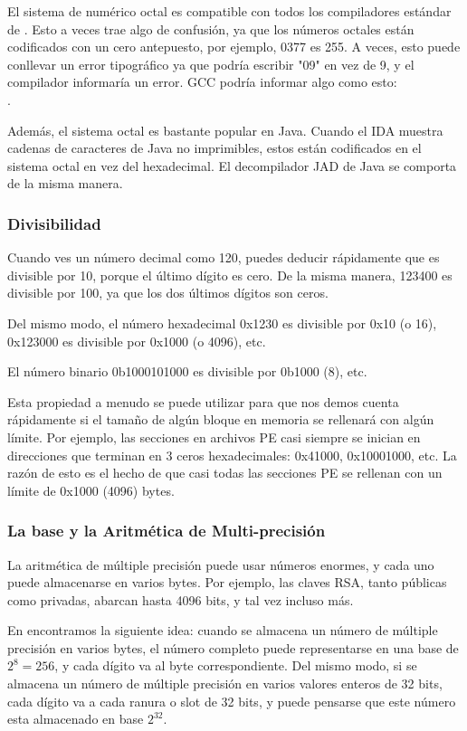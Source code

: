El sistema de numérico octal es compatible con todos los compiladores estándar de \CCpp.
Esto a veces trae algo de confusión, ya que los números octales están codificados con un cero antepuesto, por ejemplo, 0377 es 255.
A veces, esto puede conllevar un error tipográfico ya que podría escribir "09" en vez de 9, y el compilador informaría un error.
GCC podría informar algo como esto: \\
.

Además, el sistema octal es bastante popular en Java. Cuando el IDA muestra cadenas de caracteres de Java no imprimibles,
estos están codificados en el sistema octal en vez del hexadecimal.
El decompilador JAD de Java se comporta de la misma manera.

\subsubsection{Divisibilidad}

Cuando ves un número decimal como 120, puedes deducir rápidamente que es divisible por 10, porque el último dígito es cero.
De la misma manera, 123400 es divisible por 100, ya que los dos últimos dígitos son ceros.

Del mismo modo, el número hexadecimal 0x1230 es divisible por 0x10 (o 16), 0x123000 es divisible por 0x1000 (o 4096), etc.

El número binario 0b1000101000 es divisible por 0b1000 (8), etc.

Esta propiedad a menudo se puede utilizar para que nos demos cuenta rápidamente si el tamaño de algún bloque en memoria se rellenará con algún límite.
Por ejemplo, las secciones en archivos \ac {PE} casi siempre se inician en direcciones que terminan en 3 ceros hexadecimales: 0x41000, 0x10001000, etc.
La razón de esto es el hecho de que casi todas las secciones \ac{PE} se rellenan con un límite de 0x1000 (4096) bytes.

\subsubsection{La base y la Aritmética de  Multi-precisión }

La aritmética de  múltiple precisión puede usar números enormes, y cada uno puede almacenarse en varios bytes.
Por ejemplo, las claves RSA, tanto públicas como privadas, abarcan hasta 4096 bits, y tal vez incluso más.

En  encontramos la siguiente idea: cuando se almacena un número de  múltiple precisión en varios bytes,
el número completo puede representarse en una base de $ 2 ^ 8 = 256 $, y cada dígito va al byte correspondiente.
Del mismo modo, si se almacena un número de múltiple precisión en varios valores enteros de 32 bits, cada dígito va a cada ranura o slot de 32 bits,
y puede pensarse que este número esta almacenado en base $ 2 ^ {32} $.

